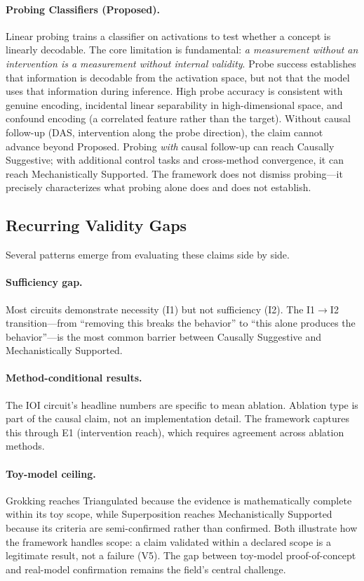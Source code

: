\documentclass[10pt]{article}
\begin{document}
\paragraph{Probing Classifiers (Proposed).} Linear probing \citep{belinkov2022probing} trains a classifier on activations to test whether a concept is linearly decodable. The core limitation is fundamental: \emph{a measurement without an intervention is a measurement without internal validity}. Probe success establishes that information is decodable from the activation space, but not that the model uses that information during inference. High probe accuracy is consistent with genuine encoding, incidental linear separability in high-dimensional space, and confound encoding (a correlated feature rather than the target). Without causal follow-up (DAS, intervention along the probe direction), the claim cannot advance beyond Proposed. Probing \emph{with} causal follow-up can reach Causally Suggestive; with additional control tasks and cross-method convergence, it can reach Mechanistically Supported. The framework does not dismiss probing---it precisely characterizes what probing alone does and does not establish.

\subsection{Recurring Validity Gaps}

Several patterns emerge from evaluating these claims side by side.

\paragraph{Sufficiency gap.} Most circuits demonstrate necessity (I1) but not sufficiency (I2). The I1$\rightarrow$I2 transition---from ``removing this breaks the behavior'' to ``this alone produces the behavior''---is the most common barrier between Causally Suggestive and Mechanistically Supported.

\paragraph{Method-conditional results.} The IOI circuit's headline numbers are specific to mean ablation. Ablation type is part of the causal claim, not an implementation detail. The framework captures this through E1 (intervention reach), which requires agreement across ablation methods.

\paragraph{Toy-model ceiling.} Grokking reaches Triangulated because the evidence is mathematically complete within its toy scope, while Superposition reaches Mechanistically Supported because its criteria are semi-confirmed rather than confirmed. Both illustrate how the framework handles scope: a claim validated within a declared scope is a legitimate result, not a failure (V5). The gap between toy-model proof-of-concept and real-model confirmation remains the field's central challenge.
\end{document}
